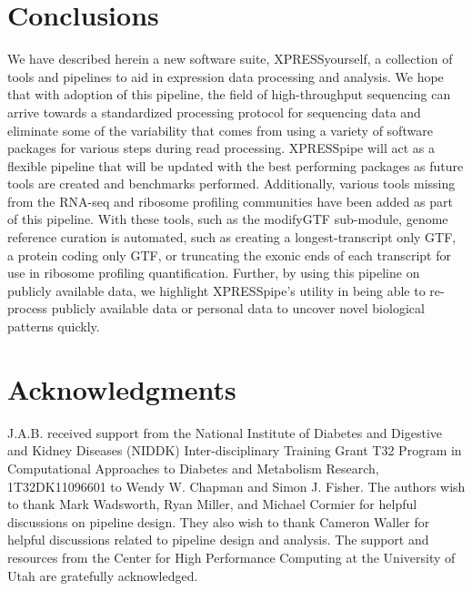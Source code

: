 \documentclass[11pt, a4paper, oneside]{article}
\begin{document}
\section{Conclusions}
We have described herein a new software suite, XPRESSyourself, a collection of tools and pipelines to aid in expression data processing and analysis. We hope that with adoption of this pipeline, the field of high-throughput sequencing can arrive towards a standardized processing protocol for sequencing data and eliminate some of the variability that comes from using a variety of software packages for various steps during read processing. XPRESSpipe will act as a flexible pipeline that will be updated with the best performing packages as future tools are created and benchmarks performed. Additionally, various tools missing from the RNA-seq and ribosome profiling communities have been added as part of this pipeline. With these tools, such as the modifyGTF sub-module, genome reference curation is automated, such as creating a longest-transcript only GTF, a protein coding only GTF, or truncating the exonic ends of each transcript for use in ribosome profiling quantification. Further, by using this pipeline on publicly available data, we highlight XPRESSpipe's utility in being able to re-process publicly available data or personal data to uncover novel biological patterns quickly.

\section*{Acknowledgments}
J.A.B. received support from the National Institute of Diabetes and Digestive and Kidney Diseases (NIDDK) Inter-disciplinary Training Grant T32 Program in Computational Approaches to Diabetes and Metabolism Research, 1T32DK11096601 to Wendy W. Chapman and Simon J. Fisher. The authors wish to thank Mark Wadsworth, Ryan Miller, and Michael Cormier for helpful discussions on pipeline design. They also wish to thank Cameron Waller for helpful discussions related to pipeline design and analysis. The support and resources from the Center for High Performance Computing at the University of Utah are gratefully acknowledged.
\end{document}
